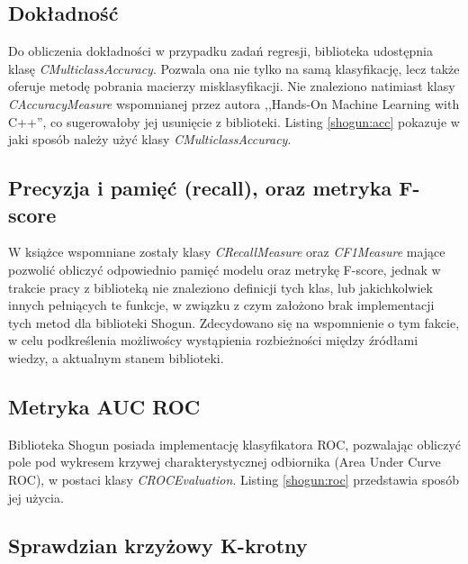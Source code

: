 
\subsection{Dokładność}

Do obliczenia dokładności w przypadku zadań regresji, biblioteka udostępnia klasę \textit{CMulticlassAccuracy}. Pozwala ona nie tylko na samą klasyfikację, lecz także oferuje metodę pobrania macierzy misklasyfikacji. Nie znaleziono natimiast klasy \textit{CAccuracyMeasure} wspomnianej przez autora ,,Hands-On Machine Learning with C++''\cite{handsOnMachineLearning}, co sugerowałoby jej usunięcie z biblioteki. Listing \ref{shogun:acc} pokazuje w jaki sposób należy użyć klasy \textit{CMulticlassAccuracy}.


\subsection{Precyzja i pamięć (recall), oraz metryka F-score}

W książce \cite{handsOnMachineLearning} wspomniane zostały klasy \textit{CRecallMeasure} oraz \textit{CF1Measure} mające pozwolić obliczyć odpowiednio pamięć modelu oraz metrykę F-score, jednak w trakcie pracy z biblioteką nie znaleziono definicji tych klas, lub jakichkolwiek innych pełniących te funkcje, w związku z czym założono brak implementacji tych metod dla biblioteki Shogun. Zdecydowano się na wspomnienie o tym fakcie, w celu podkreślenia możliwoścy wystąpienia rozbieżności między źródłami wiedzy, a aktualnym stanem biblioteki.

\subsection{Metryka AUC ROC}

Biblioteka Shogun posiada implementację klasyfikatora ROC, pozwalając obliczyć pole pod wykresem krzywej charakterystycznej odbiornika (Area Under Curve ROC), w postaci klasy \textit{CROCEvaluation}. Listing \ref{shogun:roc} przedstawia sposób jej użycia.


\subsection{Sprawdzian krzyżowy K-krotny}

